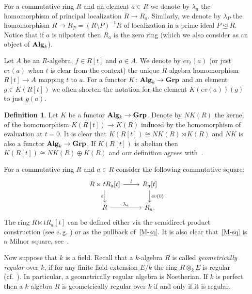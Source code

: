 \documentclass[oneside, 11pt]{amsart} \pdfoutput=1
\numberwithin{equation}{section}
\theoremstyle{definition}
\newtheorem{df}[lemma]{Definition}
\newcommand{\catname}[1]{{\normalfont\textbf{#1}}} %
\begin{document}
For a commutative ring $R$ and an element $a\in R$ we denote by $\lambda_a$ the homomorphism of principal localization $R \to R_a$. Similarly, we denote by $\lambda_P$ the homomorphism $R \to R_P = (R\setminus P)^{-1}R$ of localization in a prime ideal $P \trianglelefteq R$. Notice that if $a$ is nilpotent then $R_a$ is the zero ring (which we also consider as an object of $\catname{Alg}_k$). 

Let $A$ be an $R$-algebra, $f\in R[t]$ and $a \in A$. We denote by $ev_t(a)$ (or just $ev(a)$ when $t$ is clear from the context) the unique $R$-algebra homomorphism $R[t] \to A$ mapping $t$ to $a$. For a functor $K \colon \catname{Alg}_k \to \catname{Grp}$ and an element $g \in K(R[t])$ we often shorten the notation for the element $K(ev(a))(g)$ to just $g(a)$.

\begin{df}\label{df:NK}
Let $K$ be a functor $\catname{Alg}_k \to \catname{Grp}$.
Denote by $NK(R)$ the kernel of the homomorphism $K(R[t]) \to K(R)$ induced by the homomorphism of evaluation at $t=0$. It is clear that $K(R[t]) \cong NK(R) \rtimes K(R)$ and $NK$ is also a functor $\catname{Alg}_k \to \catname{Grp}$. If $K(R[t])$ is abelian then $K(R[t]) \cong NK(R) \oplus K(R)$ and our definition agrees with~\cite[Def.~III.3.3]{Kbook}.
\end{df}

For a commutative ring $R$ and $a \in R$ consider the following commutative square:
  \begin{equation} \label{M-sq} \begin{tikzcd} R \ltimes t R_a[t] \ar{r}{l} \ar{d}[swap]{e} & R_a[t] \ar{d}{ev(0)} \\ R \ar{r}{\lambda_a} & R_a. \end{tikzcd}\end{equation}
  The ring $R \ltimes tR_a[t]$ can be defined either via the semidirect product construction (see e.\,g. \cite[Definition~3.2]{S15}) or as the pullback of~\eqref{M-sq}.
  It is also clear that~\eqref{M-sq} is a Milnor square, see~\cite[Example~I.2.6]{Kbook}.

Now suppose that $k$ is a field. Recall that a $k$-algebra $R$ is called {\it geometrically regular} over $k$, if for any finite field extension $E/k$ the ring $R\otimes_kE$ is regular (cf.~\cite[p.~137]{Sw98}). In particular, a geometrically regular algebra is Noetherian. If $k$ is perfect then a $k$-algebra $R$ is geometrically regular over $k$ if and only if it is regular.
\end{document}
